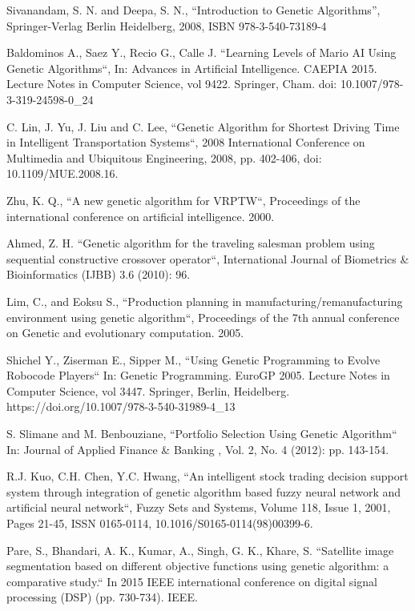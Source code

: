 \documentclass[conference]{IEEEtran}
\begin{document}
\begin{thebibliography}{00}

Sivanandam, S. N. and Deepa, S. N., ``Introduction to Genetic Algorithms'',
	Springer-Verlag Berlin Heidelberg, 2008, ISBN 978-3-540-73189-4

Baldominos A., Saez Y., Recio G., Calle J. ``Learning Levels of Mario AI Using Genetic Algorithms``,
	In: Advances in Artificial Intelligence. CAEPIA 2015. Lecture Notes in Computer Science, vol 9422. Springer, Cham. doi: 10.1007/978-3-319-24598-0\_24

C. Lin, J. Yu, J. Liu and C. Lee, ``Genetic Algorithm for Shortest Driving Time in Intelligent Transportation Systems``, 2008 International Conference on Multimedia and Ubiquitous Engineering, 2008, pp. 402-406, doi: 10.1109/MUE.2008.16.

\vfill\eject


Zhu, K. Q., ``A new genetic algorithm for VRPTW``, Proceedings of the international conference on artificial intelligence. 2000.

Ahmed, Z. H. ``Genetic algorithm for the traveling salesman problem using sequential constructive crossover operator``, International Journal of Biometrics \& Bioinformatics (IJBB) 3.6 (2010): 96.

Lim, C., and Eoksu S., ``Production planning in manufacturing/remanufacturing environment using genetic algorithm``, Proceedings of the 7th annual conference on Genetic and evolutionary computation. 2005.

Shichel Y., Ziserman E., Sipper M., ``Using Genetic Programming to Evolve Robocode Players`` In: Genetic Programming. EuroGP 2005. Lecture Notes in Computer Science, vol 3447. Springer, Berlin, Heidelberg. https://doi.org/10.1007/978-3-540-31989-4\_13

S. Slimane and M. Benbouziane, ``Portfolio Selection Using Genetic Algorithm`` In: Journal of Applied Finance \& Banking , Vol. 2, No. 4 (2012): pp. 143-154.

R.J. Kuo, C.H. Chen, Y.C. Hwang, ``An intelligent stock trading decision support system through integration of genetic algorithm based fuzzy neural network and artificial neural network``,
Fuzzy Sets and Systems,
Volume 118, Issue 1,
2001,
Pages 21-45,
ISSN 0165-0114,
10.1016/S0165-0114(98)00399-6.

Pare, S., Bhandari, A. K., Kumar, A., Singh, G. K., Khare, S. ``Satellite image segmentation based on different objective functions using genetic algorithm: a comparative study.`` In 2015 IEEE international conference on digital signal processing (DSP) (pp. 730-734). IEEE.


\end{thebibliography}
\end{document}
